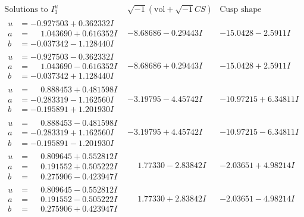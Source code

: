 \documentclass[1p]{elsarticle_modified}
\theoremstyle{definition}
\newcommand{\I}{\sqrt{-1}}
\begin{document}
$$\begin{array}{c|c|c}  
\text{Solutions to }I^u_{1}& \I (\text{vol} + \sqrt{-1}CS) & \text{Cusp shape}\\
 \hline 
\begin{aligned}
u &= -0.927503 + 0.362332 I \\
a &= \phantom{-}1.043690 + 0.616352 I \\
b &= -0.037342 - 1.128440 I\end{aligned}
 & -8.68686 - 0.29443 I & -15.0428 - 2.5911 I \\ \hline\begin{aligned}
u &= -0.927503 - 0.362332 I \\
a &= \phantom{-}1.043690 - 0.616352 I \\
b &= -0.037342 + 1.128440 I\end{aligned}
 & -8.68686 + 0.29443 I & -15.0428 + 2.5911 I \\ \hline\begin{aligned}
u &= \phantom{-}0.888453 + 0.481598 I \\
a &= -0.283319 - 1.162560 I \\
b &= -0.195891 + 1.201930 I\end{aligned}
 & -3.19795 - 4.45742 I & -10.97215 + 6.34811 I \\ \hline\begin{aligned}
u &= \phantom{-}0.888453 - 0.481598 I \\
a &= -0.283319 + 1.162560 I \\
b &= -0.195891 - 1.201930 I\end{aligned}
 & -3.19795 + 4.45742 I & -10.97215 - 6.34811 I \\ \hline\begin{aligned}
u &= \phantom{-}0.809645 + 0.552812 I \\
a &= \phantom{-}0.191552 + 0.505222 I \\
b &= \phantom{-}0.275906 - 0.423947 I\end{aligned}
 & \phantom{-}1.77330 - 2.83842 I & -2.03651 + 4.98214 I \\ \hline\begin{aligned}
u &= \phantom{-}0.809645 - 0.552812 I \\
a &= \phantom{-}0.191552 - 0.505222 I \\
b &= \phantom{-}0.275906 + 0.423947 I\end{aligned}
 & \phantom{-}1.77330 + 2.83842 I & -2.03651 - 4.98214 I \\ \hline\begin{aligned}

\end{aligned}
\end{array}$$
\end{document}
